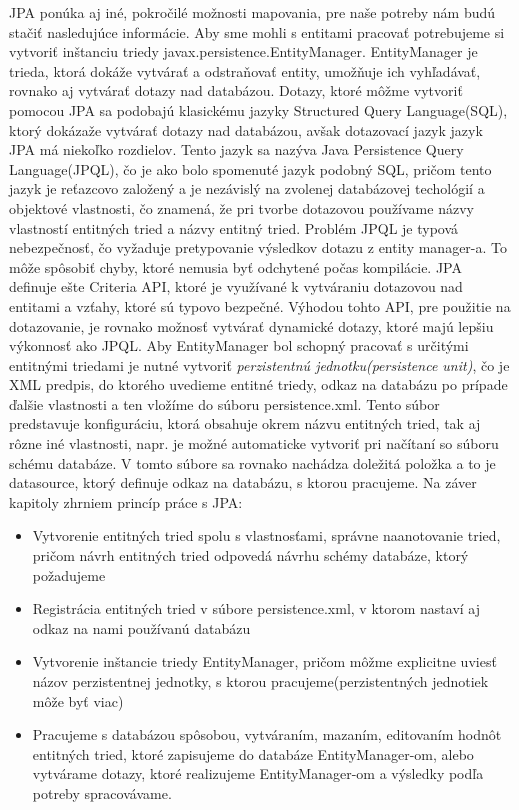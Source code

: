 JPA ponúka aj iné, pokročilé možnosti mapovania, pre naše potreby nám budú stačiť nasledujúce informácie.
\newline \indent Aby sme mohli s entitami pracovať potrebujeme si vytvoriť inštanciu triedy javax.persistence.EntityManager. EntityManager je trieda, ktorá dokáže vytvárať a odstraňovať entity, umožňuje ich vyhľadávať, rovnako aj vytvárať dotazy nad databázou. Dotazy, ktoré môžme vytvoriť pomocou JPA sa podobajú klasickému jazyky Structured Query Language(SQL), ktorý dokázaže vytvárať dotazy nad databázou, avšak dotazovací jazyk jazyk JPA má niekoľko rozdielov. Tento jazyk sa nazýva Java Persistence Query Language(JPQL), čo je ako bolo spomenuté jazyk podobný SQL, pričom tento jazyk je reťazcovo založený a je nezávislý na zvolenej databázovej techológií a objektové vlastnosti, čo znamená, že pri tvorbe dotazovou používame názvy vlastností entitných tried a názvy entitný tried. Problém JPQL je typová nebezpečnosť, čo vyžaduje pretypovanie výsledkov dotazu z entity manager-a. To môže spôsobiť chyby, ktoré nemusia byť odchytené počas kompilácie. JPA definuje ešte Criteria API, ktoré je využívané k vytváraniu dotazovou nad entitami a vzťahy, ktoré sú typovo bezpečné. Výhodou tohto API, pre použitie na dotazovanie, je rovnako možnosť vytvárať dynamické dotazy, ktoré majú lepšiu výkonnosť ako JPQL. Aby EntityManager bol schopný pracovať s určitými entitnými triedami je nutné vytvoriť \emph{perzistentnú jednotku(persistence unit)}, čo je XML predpis, do ktorého uvedieme entitné triedy, odkaz na databázu po prípade ďalšie vlastnosti a ten vložíme do súboru persistence.xml. Tento súbor predstavuje konfiguráciu, ktorá obsahuje okrem názvu entitných tried, tak aj rôzne iné vlastnosti, napr. je možné automaticke vytvoriť pri načítaní so súboru schému databáze. V tomto súbore sa rovnako nachádza doležitá položka a to je datasource, ktorý definuje odkaz na databázu, s ktorou pracujeme. Na záver kapitoly zhrniem princíp práce s JPA:
\begin{itemize}
\item Vytvorenie entitných tried spolu s vlastnosťami, správne naanotovanie tried, pričom návrh entitných tried odpovedá návrhu schémy databáze, ktorý požadujeme
\item Registrácia entitných tried v súbore persistence.xml, v ktorom nastaví aj odkaz na nami používanú databázu
\item Vytvorenie inštancie triedy EntityManager, pričom môžme explicitne uviesť názov perzistentnej jednotky, s ktorou pracujeme(perzistentných jednotiek môže byť viac)
\item Pracujeme s databázou spôsobou, vytváraním, mazaním, editovaním hodnôt entitných tried, ktoré zapisujeme do databáze EntityManager-om, alebo vytvárame dotazy, ktoré realizujeme EntityManager-om a výsledky podľa potreby spracovávame.
\end{itemize}


